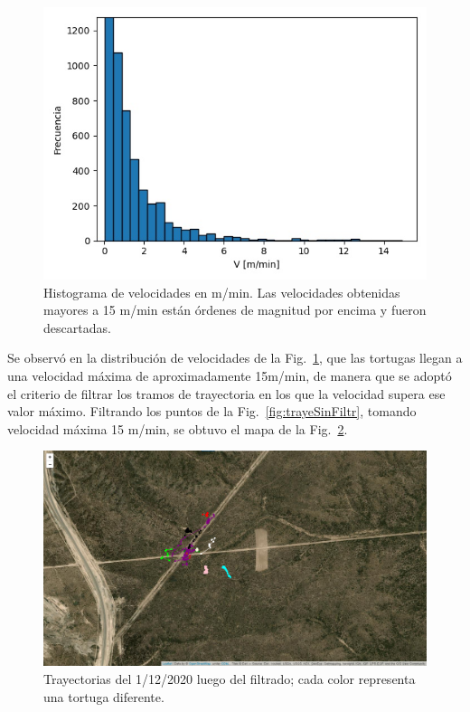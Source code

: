  
\begin{figure}[ht]
\begin{center}
       
   
    \includegraphics[width=1.2\imsize]{Chap2/Velocidades3.jpeg}
    \caption[Distribución de velocidades.]{Histograma de velocidades en m/min. Las  velocidades obtenidas mayores a 15 m/min están órdenes de magnitud por encima y fueron descartadas.}%
    \label{fig:distribuciondeVel}
\end{center}
\end{figure}
Se observó en la distribución de velocidades de la Fig.~\ref{fig:distribuciondeVel}, que las tortugas llegan a una velocidad máxima de aproximadamente 15m/min, de manera que se adoptó el criterio de filtrar los tramos de trayectoria en los que la velocidad supera ese valor máximo. Filtrando los puntos de la Fig.~\ref{fig:trayeSinFiltr}, tomando velocidad máxima 15 m/min, se obtuvo  el mapa de la Fig.~\ref{fig:trayeConFiltr}.
 
 
 
 
\begin{figure}[ht]
    \begin{center}
       
   
    \includegraphics[width=\imsize]{Chap2/Traye1_12_conF.png}
\end{center}
    \caption[Trayectorias de un día de medición, después del filtrado.]{Trayectorias del 1/12/2020 luego del filtrado; cada color representa una tortuga diferente.}
    \label{fig:trayeConFiltr}
\end{figure}
 
